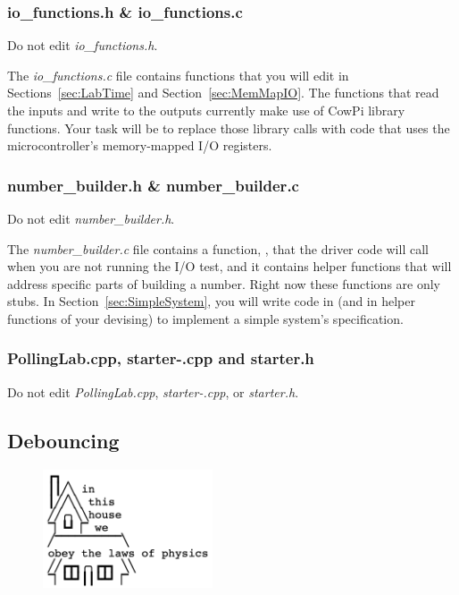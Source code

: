 \subsubsection{io\_functions.h \& io\_functions.c}

Do not edit \textit{io\_functions.h}.

The \textit{io\_functions.c} file contains functions that you will edit in Sections~\ref{sec:LabTime} and Section~\ref{sec:MemMapIO}.
The functions that read the inputs and write to the outputs currently make use of CowPi library functions.
Your task will be to replace those library calls with code that uses the microcontroller's memory-mapped I/O registers.


\subsubsection{number\_builder.h \& number\_builder.c}

Do not edit \textit{number\_builder.h}.

The \textit{number\_builder.c} file contains a function, , that the driver code will call when you are not running the I/O test,
and it contains helper functions that will address specific parts of building a number.
Right now these functions are only stubs.
In Section~\ref{sec:SimpleSystem}, you will write code in  (and in helper functions of your devising) to implement a simple system's specification.

\subsubsection{PollingLab.cpp, starter-\lowercaseprocessor.cpp and starter.h}

Do not edit \textit{PollingLab.cpp}, \textit{starter-\lowercaseprocessor.cpp}, or \textit{starter.h}.


\subsection{Debouncing} \label{subsec:debouncing}

\begin{figure}[h]
    \centering
    \includegraphics[height=3.5cm]{in-this-house}
\end{figure}

